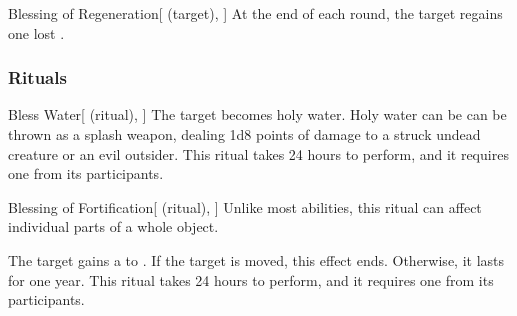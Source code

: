\lowercase{\hypertarget{spell:Blessing of Regeneration}{}}\label{spell:Blessing of Regeneration}
\begin{attuneability}[Rank 7]{\hypertarget{spell:Blessing of Regeneration}{Blessing of Regeneration}}[ (target), ]
At the end of each round, the target regains one lost .

\end{attuneability}
\vspace{0.25em}



\subsubsection{Rituals}


\lowercase{\hypertarget{spell:Bless Water}{}}\label{spell:Bless Water}
\begin{attuneability}[Rank 1]{\hypertarget{spell:Bless Water}{Bless Water}}[ (ritual), ]
The target becomes holy water.
Holy water can be can be thrown as a splash weapon, dealing 1d8 points of damage to a struck undead creature or an evil outsider.
This ritual takes 24 hours to perform, and it requires one  from its participants.
\end{attuneability}
\vspace{0.25em}



\lowercase{\hypertarget{spell:Blessing of Fortification}{}}\label{spell:Blessing of Fortification}
\begin{attuneability}[Rank 1]{\hypertarget{spell:Blessing of Fortification}{Blessing of Fortification}}[ (ritual), ]
Unlike most abilities, this ritual can affect individual parts of a whole object.

The target gains a   to .
If the target is moved, this effect ends.
Otherwise, it lasts for one year.
This ritual takes 24 hours to perform, and it requires one  from its participants.
\end{attuneability}
\vspace{0.25em}



